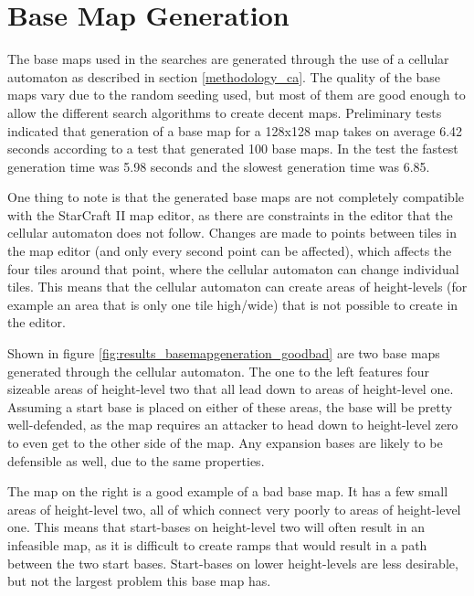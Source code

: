 \section{Base Map Generation}
\label{results_basemapgeneration}
The base maps used in the searches are generated through the use of a cellular automaton as described in section \ref{methodology_ca}. The quality of the base maps vary due to the random seeding used, but most of them are good enough to allow the different search algorithms to create decent maps. Preliminary tests indicated that generation of a base map for a 128x128 map takes on average 6.42 seconds according to a test that generated 100 base maps. In the test the fastest generation time was 5.98 seconds and the slowest generation time was 6.85.

One thing to note is that the generated base maps are not completely compatible with the StarCraft II map editor, as there are constraints in the editor that the cellular automaton does not follow. Changes are made to points between tiles in the map editor (and only every second point can be affected), which affects the four tiles around that point, where the cellular automaton can change individual tiles. This means that the cellular automaton can create areas of height-levels (for example an area that is only one tile high/wide) that is not possible to create in the editor.


Shown in figure \ref{fig:results_basemapgeneration_goodbad} are two base maps generated through the cellular automaton. The one to the left features four sizeable areas of height-level two that all lead down to areas of height-level one. Assuming a start base is placed on either of these areas, the base will be pretty well-defended, as the map requires an attacker to head down to height-level zero to even get to the other side of the map. Any expansion bases are likely to be defensible as well, due to the same properties.

The map on the right is a good example of a bad base map. It has a few small areas of height-level two, all of which connect very poorly to areas of height-level one. This means that start-bases on height-level two will often result in an infeasible map, as it is difficult to create ramps that would result in a path between the two start bases. Start-bases on lower height-levels are less desirable, but not the largest problem this base map has. 

